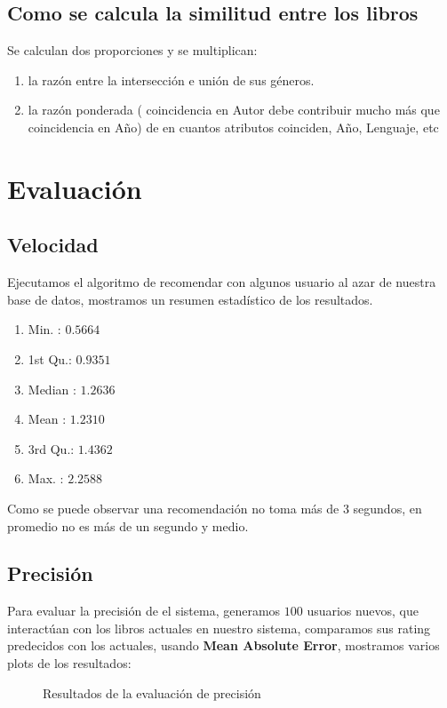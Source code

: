 \documentclass[14pt]{extarticle}
\begin{document}
\subsection{Como se calcula la similitud entre los libros}
Se calculan dos proporciones y se multiplican:

\begin{enumerate}
    \item la razón entre la intersección e unión de sus géneros.
    \item la razón ponderada ( coincidencia en Autor debe contribuir mucho más que coincidencia en Año) de en cuantos atributos coinciden, Año, Lenguaje, etc
\end{enumerate}

\section{Evaluación}
\subsection{Velocidad}

Ejecutamos el algoritmo de recomendar con algunos usuario al azar de nuestra base de datos, mostramos un resumen estadístico de los resultados. 
\begin{enumerate}
    \item Min.   : $0.5664$
    \item 1st Qu.: $0.9351$
    \item  Median : $1.2636  $
    \item Mean   : $1.2310  $
    \item 3rd Qu.: $1.4362 $
    \item Max.   : $2.2588$ 
\end{enumerate}

Como se puede observar una recomendación no toma más de $3$ segundos, en promedio no es más de un segundo y medio.

\subsection{Precisión}

Para evaluar la precisión de el sistema, generamos $100$ usuarios nuevos, que interactúan con los libros actuales en nuestro sistema, comparamos sus rating predecidos con los actuales, usando \textbf{Mean Absolute Error}, mostramos varios plots de los resultados:

\begin{figure}[H]
    \centering
    
    \caption{Resultados de la evaluación de precisión}
    \label{fig:precision-plot}
\end{figure}
\end{document}
